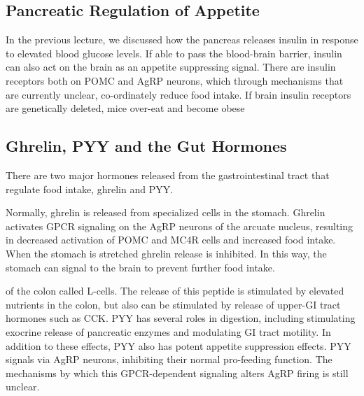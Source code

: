 \documentclass{tufte-handout}
\begin{document}
\subsection{Pancreatic Regulation of Appetite}

In the previous lecture, we discussed how the pancreas releases insulin in response to elevated blood glucose levels.  If able to pass the blood-brain barrier, insulin can also act on the brain as an appetite suppressing signal.  There are insulin receptors both on POMC and AgRP neurons, which through mechanisms that are currently unclear, co-ordinately reduce food intake. If brain insulin receptors are genetically deleted, mice over-eat and become obese\cite{Bruning2000} 

\subsection{Ghrelin, PYY and the Gut Hormones}

There are two major hormones released from the gastrointestinal tract that regulate food intake, ghrelin and  PYY.  

Normally, ghrelin is released from specialized cells in the stomach.   Ghrelin activates GPCR signaling on the AgRP neurons of the arcuate nucleus, resulting in decreased activation of POMC and MC4R cells and increased food intake.  When the stomach is stretched ghrelin release is inhibited.  In this way, the stomach can signal to the brain to prevent further food intake.

 of the colon called L-cells.  The release of this peptide is stimulated by elevated nutrients in the colon, but also can be stimulated by release of upper-GI tract hormones such as CCK.  PYY has several roles in digestion, including stimulating exocrine release of pancreatic enzymes and modulating GI tract motility.  In addition to these effects, PYY also has potent appetite suppression effects.  PYY signals via AgRP neurons, inhibiting their normal pro-feeding function.  The mechanisms by which this GPCR-dependent signaling alters AgRP firing is still unclear.
\end{document}
